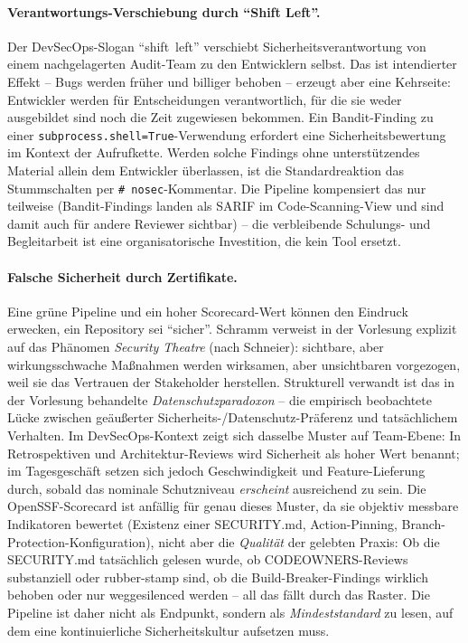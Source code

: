 \documentclass[12pt, a4paper]{scrartcl}
\begin{document}
\paragraph{Verantwortungs-Verschiebung durch \enquote{Shift Left}.}
Der DevSecOps-Slogan \enquote{shift~left} verschiebt
Sicherheitsverantwortung von einem nachgelagerten Audit-Team zu den
Entwicklern selbst. Das ist intendierter Effekt -- Bugs werden früher
und billiger behoben -- erzeugt aber eine Kehrseite: Entwickler werden
für Entscheidungen verantwortlich, für die sie weder ausgebildet
sind noch die Zeit zugewiesen bekommen. Ein Bandit-Finding zu einer
\texttt{subprocess.shell=True}-Verwendung erfordert eine
Sicherheitsbewertung im Kontext der Aufrufkette. Werden solche
Findings ohne unterstützendes Material allein dem Entwickler überlassen,
ist die Standardreaktion das Stummschalten per
\texttt{\# nosec}-Kommentar. Die Pipeline kompensiert das nur
teilweise (Bandit-Findings landen als SARIF im Code-Scanning-View und
sind damit auch für andere Reviewer sichtbar) -- die
verbleibende Schulungs- und Begleitarbeit ist eine organisatorische
Investition, die kein Tool ersetzt.

\paragraph{Falsche Sicherheit durch Zertifikate.}
Eine grüne Pipeline und ein hoher Scorecard-Wert können den Eindruck
erwecken, ein Repository sei \enquote{sicher}. Schramm verweist in der
Vorlesung explizit auf das Phänomen \emph{Security Theatre} (nach
Schneier): sichtbare, aber wirkungsschwache Maßnahmen werden
wirksamen, aber unsichtbaren vorgezogen, weil sie das Vertrauen der
Stakeholder herstellen. Strukturell verwandt ist das in der Vorlesung
behandelte \emph{Datenschutzparadoxon} -- die empirisch beobachtete
Lücke zwischen geäußerter Sicherheits-/Datenschutz-Präferenz und
tatsächlichem Verhalten. Im DevSecOps-Kontext zeigt sich dasselbe
Muster auf Team-Ebene: In Retrospektiven und Architektur-Reviews wird
Sicherheit als hoher Wert benannt; im Tagesgeschäft setzen sich
jedoch Geschwindigkeit und Feature-Lieferung durch, sobald das
nominale Schutzniveau \emph{erscheint} ausreichend zu sein. Die
OpenSSF-Scorecard ist anfällig für genau dieses Muster, da sie
objektiv messbare Indikatoren bewertet (Existenz einer SECURITY.md,
Action-Pinning, Branch-Protection-Konfiguration), nicht aber die
\emph{Qualität} der gelebten Praxis: Ob die SECURITY.md tatsächlich
gelesen wurde, ob CODEOWNERS-Reviews substanziell oder rubber-stamp
sind, ob die Build-Breaker-Findings wirklich behoben oder nur
weggesilenced werden -- all das fällt durch das Raster. Die Pipeline
ist daher nicht als Endpunkt, sondern als \emph{Mindeststandard} zu
lesen, auf dem eine kontinuierliche Sicherheitskultur aufsetzen
muss.
\end{document}
